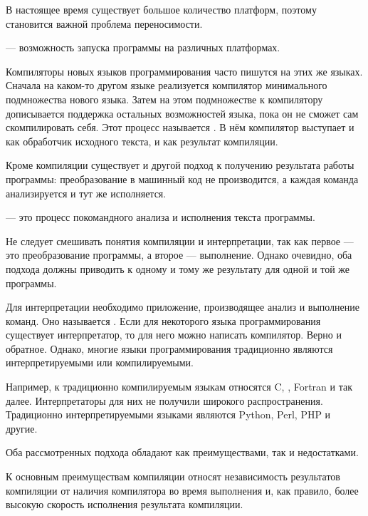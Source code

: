 В настоящее время существует большое количество платформ, поэтому
становится важной проблема переносимости.

\begin{defn}
   — возможность запуска программы на различных
  платформах.
\end{defn}

Компиляторы новых языков программирования часто пишутся на этих же
языках. Сначала на каком-то другом языке реализуется компилятор
минимального подмножества нового языка. Затем на этом подмножестве к
компилятору дописывается поддержка остальных возможностей языка, пока
он не сможет сам скомпилировать себя. Этот процесс называется
. В нём компилятор
выступает и как обработчик исходного текста, и как результат
компиляции.

Кроме компиляции существует и другой подход к получению результата
работы программы: преобразование в машинный код не производится, а
каждая команда анализируется и тут же исполняется.

\begin{defn}
   — это процесс покомандного
  анализа и исполнения текста программы.
\end{defn}

Не следует смешивать понятия компиляции и интерпретации, так как первое
— это преобразование программы, а второе — выполнение. Однако очевидно,
оба подхода должны приводить к одному и тому же результату для одной
и той же программы.

Для интерпретации необходимо приложение, производящее анализ и
выполнение команд. Оно называется
. Если для некоторого языка
программирования существует интерпретатор, то для него можно написать
компилятор. Верно и обратное. Однако, многие языки программирования
традиционно являются интерпретируемыми или компилируемыми.

Например, к традиционно компилируемым языкам относятся C, \CPP,
Fortran и так далее. Интерпретаторы для них не получили широкого
распространения.  Традиционно интерпретируемыми языками являются
Python, Perl, PHP и другие.

Оба рассмотренных подхода обладают как преимуществами, так и
недостатками.

К основным преимуществам компиляции относят независимость результатов
компиляции от наличия компилятора во время выполнения и, как правило,
более высокую скорость исполнения результата компиляции.


